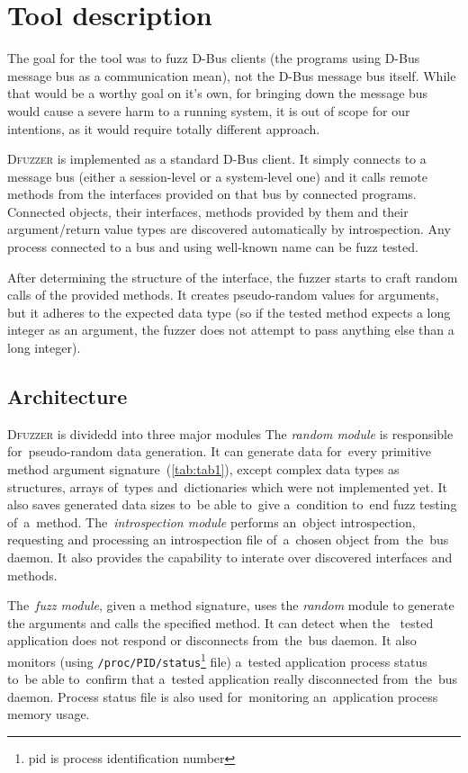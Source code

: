 \documentclass[conference]{IEEEtran}
\begin{document}
\section{Tool description}
The goal for the tool was to fuzz D-Bus clients (the programs using D-Bus
message bus as a communication mean), not the D-Bus message bus itself. While
that would be a worthy goal on it's own, for bringing down the message bus
would cause a severe harm to a running system, it is out of scope for our
intentions, as it would require totally different approach.

\textsc{Dfuzzer} is implemented as a standard D-Bus client. It simply connects to a
message bus (either a session-level or a system-level one) and it calls remote
methods from the interfaces provided on that bus by connected programs.
Connected objects, their interfaces, methods provided by them and their
argument/return value types are discovered automatically by introspection. Any process connected to a bus and using well-known name can be fuzz tested.

After determining the structure of the interface, the fuzzer starts to craft
random calls of the provided methods. It creates pseudo-random values for
arguments, but it adheres to the expected data type (so if the tested method
expects a long integer as an argument, the fuzzer does not attempt to pass
anything else than a long integer).

\subsection{Architecture}
\textsc{Dfuzzer} is dividedd into three major modules The \emph{random module} is
responsible for~pseudo-random data generation. It can generate data for~every
primitive method argument signature~(\ref{tab:tab1}), except complex data types
as structures, arrays of~types and~dictionaries which were not implemented yet.
It also saves generated data sizes to~be able to~give a~condition to~end fuzz
testing of~a~method. The~\emph{introspection module} performs an~object
introspection, requesting and processing an introspection file of~a~chosen
object from~the~bus daemon. It also provides the capability to interate over
discovered interfaces and methods.

The~\emph{fuzz module}, given a method signature, uses the \emph{random} module
to generate the arguments and calls the specified method. It can detect when
the ~tested application does not respond or disconnects from~the~bus daemon.
It also monitors (using \texttt{/proc/PID/status}\footnote{pid is process
identification number} file) a~tested application process status to~be able
to~confirm that a~tested application really disconnected from~the~bus daemon.
Process status file is also used for~monitoring an~application process memory
usage.
\end{document}
